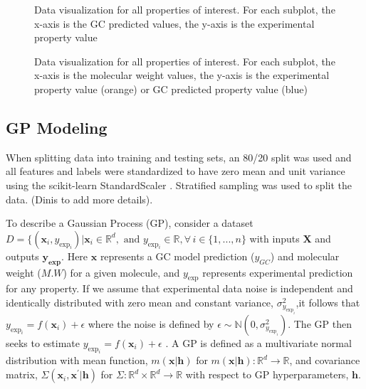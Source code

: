 \documentclass[journal=jacsat,manuscript=article]{achemso}
\begin{document}
\begin{figure}[H] %
    \centering
    \caption{Data visualization for all properties of interest. For each subplot, the x-axis is the GC predicted values, the y-axis is the experimental property value}
    \label{fig:3D_Data_Vis_GC}
\end{figure}

\begin{figure}[H]
    \centering
    \caption{Data visualization for all properties of interest. For each subplot, the x-axis is the molecular weight values, the y-axis is the experimental property value (orange) or GC predicted property value (blue)}
    \label{fig:3D_Data_Vis_MW}
\end{figure}

\subsection{GP Modeling}
When splitting data into training and testing sets, an 80/20 split was used and all features and labels were standardized to have zero mean and unit variance using the scikit-learn StandardScaler \cite{scikit-learn} . Stratified sampling was used to split the data. (Dinis to add more details).

To describe a Gaussian Process (GP), consider a dataset $D = \{(\mathbf{x}_i, y_{\text{exp}_i}) \vert \mathbf{x}_i \in \mathbb{R}^d, \text{ and } y_{\text{exp}_i} \in \mathbb{R}, \forall \, i \in \{1,. . ., n\}$ with inputs $\mathbf{X}$ and outputs $\mathbf{y_{\text{exp}}}$. Here $\mathbf{x}$ represents a GC model prediction ($y_{GC}$) and molecular weight ($M.W$) for a given molecule, and $y_{\text{exp}}$ represents experimental prediction for any property. If we assume that experimental data noise is independent and identically distributed with zero mean and constant variance, $\sigma_{y_{\text{exp}_i}}^2$,it follows that $y_{\text{exp}_i} = f(\mathbf{x}_i) + \epsilon$ where the noise is defined by $\epsilon \sim \mathbb{N}(0,\sigma_{y_{\text{exp}_i}}^2)$. The GP then seeks to estimate $y_{\text{exp}_i} = f(\mathbf{x}_i) + \epsilon$ \cite{Frazier2018AOptimization}. A GP is defined as a multivariate normal distribution with mean function, $m(\mathbf{x}\vert \mathbf{h})$ for $m(\mathbf{x}\vert \mathbf{h}): \mathbb{R}^d \rightarrow \mathbb{R}$, and covariance matrix, $\Sigma(\mathbf{x}_i, \mathbf{x}^{\prime} \vert \mathbf{h})$ for $\Sigma: \mathbb{R}^d \times \mathbb{R}^d \rightarrow \mathbb{R}$ with respect to GP hyperparameters, $\mathbf{h}$.
\end{document}
